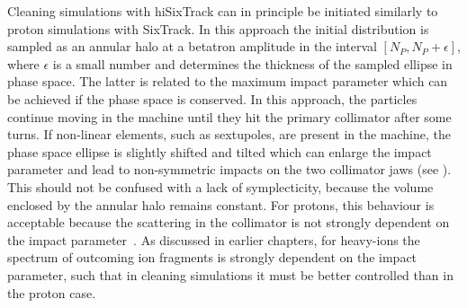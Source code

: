Cleaning simulations with hiSixTrack can in principle be initiated similarly to proton simulations with SixTrack. In this approach the initial distribution is sampled as an annular halo at a betatron amplitude in the interval $[N_P, N_P+\epsilon]$, where $\epsilon$ is a small number and determines the thickness of the sampled ellipse in phase space. The latter is related to the maximum impact parameter which can be achieved if the phase space is conserved. In this approach, the particles continue moving in the machine until they hit the primary collimator after some turns. If non-linear elements, such as sextupoles, are present in the machine, the phase space ellipse is slightly shifted and tilted which can enlarge the impact parameter and lead to non-symmetric impacts on the two collimator jaws (see ). This should not be confused with a lack of symplecticity, because the volume enclosed by the annular halo remains constant. For protons, this behaviour is acceptable because the scattering in the collimator is not strongly dependent on the impact parameter~\cite{Bruce2014a}. As discussed in earlier chapters, for heavy-ions the spectrum of outcoming ion fragments is strongly dependent on the impact parameter, such that in cleaning simulations it must be better controlled than in the proton case.



